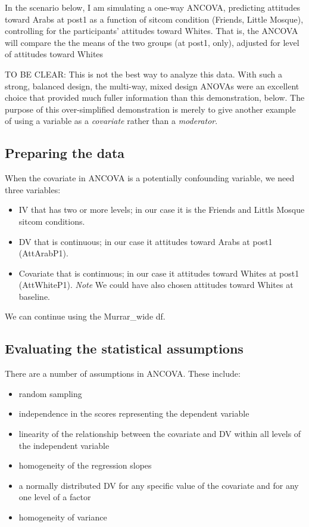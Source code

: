 \documentclass[
  11pt,
]{book}
\providecommand{\tightlist}{%
  \setlength{\itemsep}{0pt}\setlength{\parskip}{0pt}}
\begin{document}
In the scenario below, I am simulating a one-way ANCOVA, predicting attitudes toward Arabs at post1 as a function of sitcom condition (Friends, Little Mosque), controlling for the participants' attitudes toward Whites. That is, the ANCOVA will compare the the means of the two groups (at post1, only), adjusted for level of attitudes toward Whites

TO BE CLEAR: This is not the best way to analyze this data. With such a strong, balanced design, the multi-way, mixed design ANOVAs were an excellent choice that provided much fuller information than this demonstration, below. The purpose of this over-simplified demonstration is merely to give another example of using a variable as a \emph{covariate} rather than a \emph{moderator}.

\hypertarget{preparing-the-data-1}{%
\subsection{Preparing the data}\label{preparing-the-data-1}}

When the covariate in ANCOVA is a potentially confounding variable, we need three variables:

\begin{itemize}
\tightlist
\item
  IV that has two or more levels; in our case it is the Friends and Littls Mosque sitcom conditions.
\item
  DV that is continuous; in our case it attitudes toward Arabs at post1 (AttArabP1).
\item
  Covariate that is continuous; in our case it attitudes toward Whites at post1 (AttWhiteP1). \emph{Note} We could have also chosen attitudes toward Whites at baseline.
\end{itemize}

We can continue using the Murrar\_wide df.

\hypertarget{evaluating-the-statistical-assumptions-6}{%
\subsection{Evaluating the statistical assumptions}\label{evaluating-the-statistical-assumptions-6}}

There are a number of assumptions in ANCOVA. These include:

\begin{itemize}
\tightlist
\item
  random sampling
\item
  independence in the scores representing the dependent variable
\item
  linearity of the relationship between the covariate and DV within all levels of the independent variable
\item
  homogeneity of the regression slopes
\item
  a normally distributed DV for any specific value of the covariate and for any one level of a factor
\item
  homogeneity of variance
\end{itemize}
\end{document}
